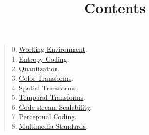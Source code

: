 

\title{\SM{} \newline Contents}

\maketitle

\begin{quote}
0. \href{https://sistemas-multimedia.github.io/contents/working_environment}{Working Environment}.\\
1. \href{https://sistemas-multimedia.github.io/contents/entropy_coding}{Entropy Coding}. \\
2. \href{https://sistemas-multimedia.github.io/contents/quantization}{Quantization}. \\
3. \href{https://sistemas-multimedia.github.io/contents/color_transforms}{Color Transforms}. \\
4. \href{https://sistemas-multimedia.github.io/contents/spatial_transforms}{Spatial Transforms}. \\
5. \href{https://sistemas-multimedia.github.io/contents/temporal_transforms}{Temporal Transforms}. \\
6. \href{https://sistemas-multimedia.github.io/contents/data_scalability}{Code-stream Scalability}. \\
7. \href{https://sistemas-multimedia.github.io/contents/perceptual_coding}{Perceptual Coding}. \\
8. \href{https://sistemas-multimedia.github.io/contents/standards}{Multimedia Standards}.  %
\end{quote}



